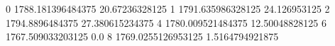 0 1788.181396484375 20.67236328125
1 1791.635986328125 24.126953125
2 1794.8896484375 27.380615234375
4 1780.009521484375 12.50048828125
6 1767.509033203125 0.0
8 1769.0255126953125 1.5164794921875
